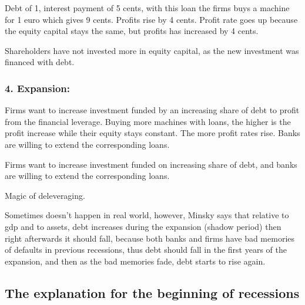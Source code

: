 \documentclass{report}
\begin{document}
Debt of 1, interest payment of 5 cents, with this loan the firms buys a machine for 1 euro which gives 9 cents. Profits rise by 4 cents. Profit rate goes up because the equity capital stays the same, but profits has increased by 4 cents. 

Shareholders have not invested more in equity capital, as the new investment was financed with debt. 

\subsubsection{4. Expansion:}

Firms want to increase investment funded by an increasing share of debt to profit from the financial leverage. Buying more machines with loans, the higher is the profit increase while their equity stays constant. The more profit rates rise. Banks are willing to extend the corresponding loans. 

Firms want to increase investment funded on increasing share of debt, and banks are willing to extend the corresponding loans. 

\begin{figure}[!h]
    \centering
{}
\end{figure}

Magic of deleveraging. 

Sometimes doesn’t happen in real world, however, Minsky says that relative to gdp and to assets, debt increases during the expansion (shadow period) then right afterwards it should fall, because both banks and firms have bad memories of defaults in previous recessions, thus debt should fall in the first years of the expansion, and then as the bad memories fade, debt starts to rise again. 

\subsection{The explanation for the beginning of recessions}
\end{document}

